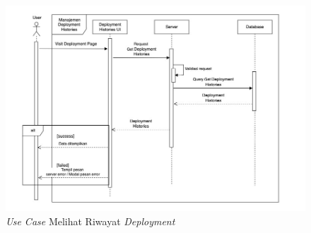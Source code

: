 \begin{figure}[ht]
  \centering
  \includegraphics[width=1\textwidth]{resources/chapter-3/usecase/uc-13.jpg}
  \caption{\textit{Use Case} Melihat Riwayat \textit{Deployment}}
  \label{fig:usecase-13}
\end{figure}

\pagebreak